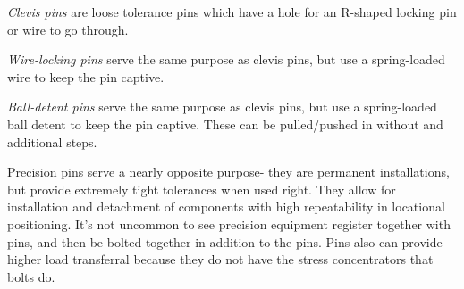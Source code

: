 	\begin{asparaenum}[a)]
		\item \textit{Clevis pins} are loose tolerance pins which have a hole for an R-shaped locking pin or wire to go through.
		\item \textit{Wire-locking pins} serve the same purpose as clevis pins, but use a spring-loaded wire to keep the pin captive.
		\item \textit{Ball-detent pins} serve the same purpose as clevis pins, but use a spring-loaded ball detent to keep the pin captive. These can be pulled/pushed in without and additional steps.
	\end{asparaenum}
	
	
	Precision pins serve a nearly opposite purpose- they are permanent installations, but provide extremely tight tolerances when used right. They allow for installation and detachment of components with high repeatability in locational positioning. It's not uncommon to see precision equipment register together with pins, and then be bolted together in addition to the pins. Pins also can provide higher load transferral because they do not have the stress concentrators that bolts do.
	
